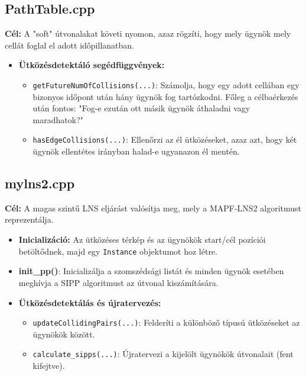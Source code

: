 \documentclass[a4paper,12pt]{article}
\begin{document}
\subsection{PathTable.cpp}
\textbf{Cél:} A "soft" útvonalakat követi nyomon, azaz rögzíti, hogy mely ügynök mely cellát foglal el adott időpillanatban.

\begin{itemize}[label=\textbullet]
    \item \textbf{Ütközésdetektáló segédfüggvények:}
    \begin{itemize}
        \item \texttt{getFutureNumOfCollisions(...)}:
        Számolja, hogy egy adott cellában egy bizonyos időpont után hány ügynök fog tartózkodni. Főleg a célbaérkezés után fontos: "Fog-e ezután ott másik ügynök áthaladni vagy maradhatok?"

        \item \texttt{hasEdgeCollisions(...)}:
        Ellenőrzi az él ütközéseket, azaz azt, hogy két ügynök ellentétes irányban halad-e ugyanazon él mentén.
    \end{itemize}
\end{itemize}

\subsection{mylns2.cpp}
\textbf{Cél:} A magas szintű LNS eljárást valósítja meg, mely a MAPF-LNS2 algoritmust reprezentálja.

\begin{itemize}[label=\textbullet]
    \item \textbf{Inicializáció:}
    Az ütközéses térkép és az ügynökök start/cél pozíciói betöltődnek, majd egy \texttt{Instance} objektumot hoz létre.

    \item \textbf{init\_pp()}:
    Inicializálja a szomszédsági listát és minden ügynök esetében meghívja a SIPP algoritmust az útvonal kiszámítására.

    \item \textbf{Ütközésdetektálás és újratervezés:}
    \begin{itemize}
        \item \texttt{updateCollidingPairs(...)}: Felderíti a különböző típusú ütközéseket az ügynökök között.

        \item \texttt{calculate\_sipps(...)}: Újratervezi a kijelölt ügynökök útvonalait (fent kifejtve).
    \end{itemize}
\end{itemize}
\end{document}
